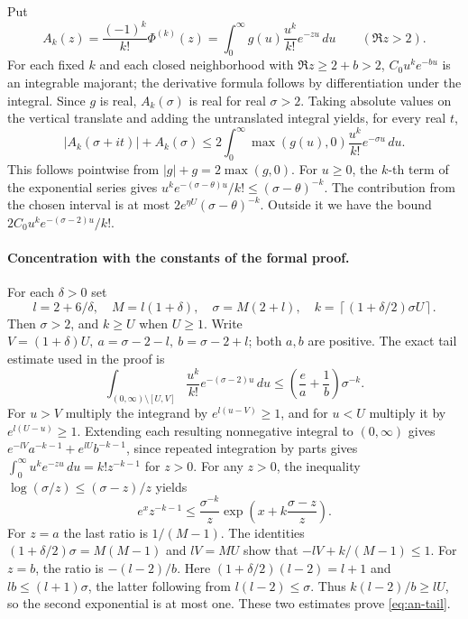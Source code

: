 Put
\[
 A_k(z)=\frac{(-1)^k}{k!}\Phi^{(k)}(z)
       =\int_0^\infty g(u)\frac{u^k}{k!}e^{-zu}\,du
       \qquad(\Re z>2).
\]
For each fixed \(k\) and each closed neighborhood with
\(\Re z\geq2+b>2\), \(C_0u^ke^{-bu}\) is an integrable majorant;
the derivative formula follows by differentiation under the integral.
Since \(g\) is real, \(A_k(\sigma)\) is real for real \(\sigma>2\).
Taking absolute values on the vertical translate and adding the
untranslated integral yields, for every real \(t\),
\[
 |A_k(\sigma+it)|+A_k(\sigma)
  \leq 2\int_0^\infty \max(g(u),0)\frac{u^k}{k!}e^{-\sigma u}\,du .
\]
This follows pointwise from \(|g|+g=2\max(g,0)\). For \(u\geq0\),
the \(k\)-th term of the exponential series gives
\(u^ke^{-(\sigma-\theta)u}/k!\leq(\sigma-\theta)^{-k}\).
The contribution from the chosen interval is at most
\(2e^{\eta U}(\sigma-\theta)^{-k}\). Outside it we have the bound
\(2C_0u^ke^{-(\sigma-2)u}/k!\).

\paragraph{Concentration with the constants of the formal proof.}
For each \(\delta>0\) set
\[
 l=2+6/\delta,\quad M=l(1+\delta),\quad \sigma=M(2+l),\quad
 k=\left\lceil (1+\delta/2)\sigma U\right\rceil .
\]
Then \(\sigma>2\), and \(k\geq U\) when \(U\geq1\). Write
\(V=(1+\delta)U,\ a=\sigma-2-l,\ b=\sigma-2+l\); both \(a,b\) are positive.
The exact tail estimate used in the proof is
\begin{equation}
 \int_{(0,\infty)\setminus[U,V]}
 \frac{u^k}{k!}e^{-(\sigma-2)u}\,du
 \leq\left(\frac{e}{a}+\frac1b\right)\sigma^{-k}.
 \label{eq:an-tail}
\end{equation}
For \(u>V\) multiply the integrand by \(e^{l(u-V)}\geq1\), and for
\(u<U\) multiply it by \(e^{l(U-u)}\geq1\). Extending each resulting
nonnegative integral to \((0,\infty)\) gives
\(e^{-lV}a^{-k-1}+e^{lU}b^{-k-1}\), since repeated integration by parts
gives \(\int_0^\infty u^ke^{-zu}\,du=k!z^{-k-1}\) for \(z>0\).
For any \(z>0\), the inequality \(\log(\sigma/z)\leq(\sigma-z)/z\) yields
\[
 e^x z^{-k-1}\leq \frac{\sigma^{-k}}{z}
   \exp\!\left(x+k\frac{\sigma-z}{z}\right).
\]
For \(z=a\) the last ratio is \(1/(M-1)\). The identities
\((1+\delta/2)\sigma=M(M-1)\) and \(lV=MU\) show that
\(-lV+k/(M-1)\leq1\). For \(z=b\), the ratio is
\(-(l-2)/b\). Here \((1+\delta/2)(l-2)=l+1\) and \(lb\leq(l+1)\sigma\),
the latter following from \(l(l-2)\leq\sigma\). Thus \(k(l-2)/b\geq lU\),
so the second exponential is at most one. These two estimates prove
\eqref{eq:an-tail}.

